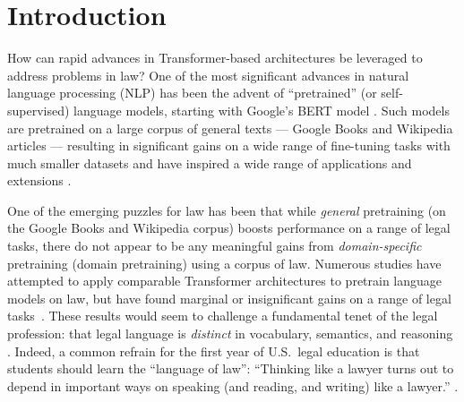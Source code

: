 \documentclass[sigconf]{acmart}
\begin{document}


\maketitle

\section{Introduction}
How can rapid advances in Transformer-based architectures be leveraged to address problems in law?  One of the most significant advances in natural language processing (NLP) has been the advent of ``pretrained'' (or self-supervised) language models, starting with Google's BERT model \cite{devlin-etal-2019-bert}. Such models are pretrained on a large corpus of general texts --- Google Books and Wikipedia articles --- resulting in significant gains on a wide range of fine-tuning tasks with much smaller datasets and have inspired a wide range of applications and extensions \cite{liu2019roberta, rogers2021primer}. 

One of the emerging puzzles for law has been that while \emph{general} pretraining (on the Google Books and Wikipedia corpus) boosts performance on a range of legal tasks, there do not appear to be any meaningful gains from \emph{domain-specific} pretraining (domain pretraining) using a corpus of law. Numerous studies have attempted to apply comparable Transformer architectures to pretrain language models on law, but have found marginal or insignificant gains on a range of legal tasks~\cite{chalkidis-etal-2020-legal, Elwany2019, zhong2020does, zhong2020jec}.  These results would seem to challenge a fundamental tenet of the legal profession: that legal language is \emph{distinct} in vocabulary, semantics, and reasoning \cite{mellinkoff2004language,mertz2007language, tiersma1999legal}.  Indeed, a common refrain for the first year of U.S.\ legal education is that students should learn the ``language of law'': ``Thinking like a lawyer turns out to
depend in important ways on speaking (and reading, and writing) like a lawyer.'' \cite{mertz2007language}.
\end{document}
